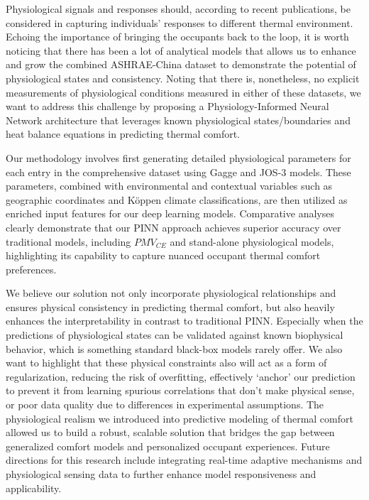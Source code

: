 Physiological signals and responses should, according to recent publications\cite{baePredictingIndoorThermal2017}, be considered in capturing individuals' responses to different thermal environment. Echoing the importance of bringing the occupants back to the loop, it is worth noticing that there has been a lot of analytical models that allows us to enhance and grow the combined ASHRAE-China dataset to demonstrate the potential of physiological states and consistency\cite{yangComparativeAnalysisIndoor2024}. Noting that there is, nonetheless, no explicit measurements of physiological conditions measured in either of these datasets, we want to address this challenge by proposing a Physiology-Informed Neural Network architecture that leverages known physiological states/boundaries and heat balance equations in predicting thermal comfort.

Our methodology involves first generating detailed physiological parameters for each entry in the comprehensive dataset using Gagge and JOS-3 models. These parameters, combined with environmental and contextual variables such as geographic coordinates and Köppen climate classifications, are then utilized as enriched input features for our deep learning models. Comparative analyses clearly demonstrate that our PINN approach achieves superior accuracy over traditional models, including $PMV_{CE}$ and stand-alone physiological models, highlighting its capability to capture nuanced occupant thermal comfort preferences.

We believe our solution not only incorporate physiological relationships and ensures physical consistency in predicting thermal comfort, but also heavily enhances the interpretability in contrast to traditional PINN. Especially when the predictions of physiological states can be validated against known biophysical behavior, which is something standard black-box models rarely offer. We also want to highlight that these physical constraints also will act as a form of regularization, reducing the risk of overfitting, effectively `anchor' our prediction to prevent it from learning spurious correlations that don't make physical sense, or poor data quality due to differences in experimental assumptions. The physiological realism we introduced into predictive modeling of thermal comfort allowed us to build a robust, scalable solution that bridges the gap between generalized comfort models and personalized occupant experiences. Future directions for this research include integrating real-time adaptive mechanisms and physiological sensing data to further enhance model responsiveness and applicability.